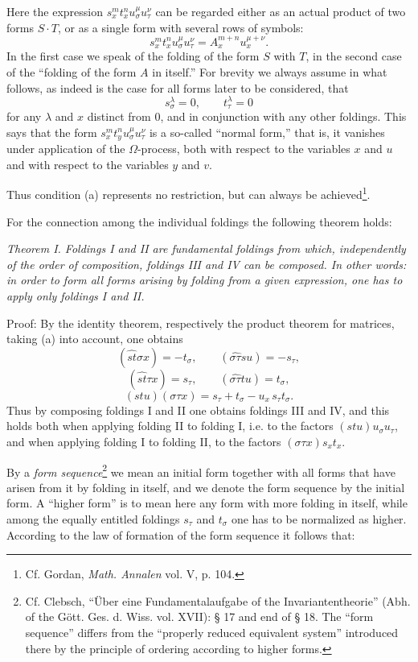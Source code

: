 \documentclass[11pt]{article}
\begin{document}
Here the expression $s_x^m t_x^n u_\sigma^\mu u_\tau^\nu$ can be regarded either as an actual product of two forms $S\cdot T$, or as a single form with several rows of symbols:
\[
s_x^m t_x^n u_\sigma^\mu u_\tau^\nu=A_x^{m+n}u_x^{\mu+\nu}.
\]
In the first case we speak of the folding of the form $S$ with $T$, in the second case of the ``folding of the form $A$ in itself.'' For brevity we always assume in what follows, as indeed is the case for all forms later to be considered, that
\[
\tag{a}
s_\sigma^\lambda=0,\qquad t_\tau^\lambda=0
\]
for any $\lambda$ and $x$ distinct from 0, and in conjunction with any other foldings. This says that the form $s_x^m t_y^n u_\sigma^\mu u_\tau^\nu$ is a so-called ``normal form,'' that is, it vanishes under application of the $\Omega$-process, both with respect to the variables $x$ and $u$ and with respect to the variables $y$ and $v$.

Thus condition (a) represents no restriction, but can always be achieved\footnote{Cf. Gordan, \emph{Math. Annalen} vol. V, p. 104.}.

For the connection among the individual foldings the following theorem holds:

\emph{Theorem I. Foldings I and II are fundamental foldings from which, independently of the order of composition, foldings III and IV can be composed. In other words: in order to form all forms arising by folding from a given expression, one has to apply only foldings I and II.}

Proof: By the identity theorem, respectively the product theorem for matrices, taking (a) into account, one obtains
\[
(\widehat{st}\sigma x)=-t_\sigma,\qquad
(\widehat{\sigma\tau}su)=-s_\tau,
\]
\[
(\widehat{st}\tau x)=s_\tau,\qquad
(\widehat{\sigma\tau}tu)=t_\sigma,
\]
\[
(stu)(\sigma\tau x)=s_\tau+t_\sigma-u_x\,s_\tau t_\sigma .
\]
Thus by composing foldings I and II one obtains foldings III and IV, and this holds both when applying folding II to folding I, i.e. to the factors $(stu)u_\sigma u_\tau$, and when applying folding I to folding II, to the factors $(\sigma\tau x)s_xt_x$.

By a \emph{form sequence}\footnote{Cf. Clebsch, ``Über eine Fundamentalaufgabe of the Invariantentheorie'' (Abh. of the Gött. Ges. d. Wiss. vol. XVII): § 17 and end of § 18. The ``form sequence'' differs from the ``properly reduced equivalent system'' introduced there by the principle of ordering according to higher forms.} we mean an initial form together with all forms that have arisen from it by folding in itself, and we denote the form sequence by the initial form. A ``higher form'' is to mean here any form with more folding in itself, while among the equally entitled foldings $s_\tau$ and $t_\sigma$ one has to be normalized as higher. According to the law of formation of the form sequence it follows that:
\end{document}
